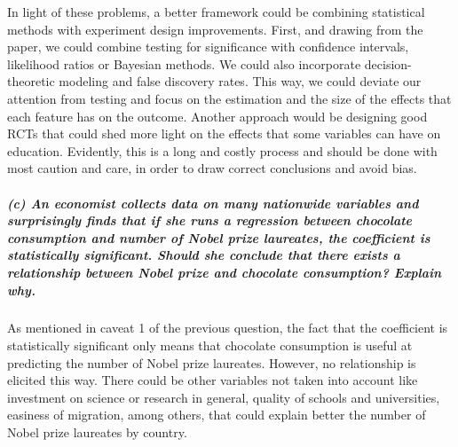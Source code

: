 \documentclass[11pt, english]{article}
\begin{document}
In light of these problems, a better framework could be combining
statistical methods with experiment design improvements. First, and
drawing from the paper, we could combine testing for significance with
confidence intervals, likelihood ratios or Bayesian methods. We could
also incorporate decision-theoretic modeling and false discovery rates.
This way, we could deviate our attention from testing and focus on the
estimation and the size of the effects that each feature has on the
outcome. Another approach would be designing good RCTs that could shed
more light on the effects that some variables can have on education.
Evidently, this is a long and costly process and should be done with
most caution and care, in order to draw correct conclusions and avoid
bias.

    \hypertarget{c-an-economist-collects-data-on-many-nationwide-variables-and-surprisingly-finds-that-if-she-runs-a-regression-between-chocolate-consumption-and-number-of-nobel-prize-laureates-the-coefficient-is-statistically-significant.-should-she-conclude-that-there-exists-a-relationship-between-nobel-prize-and-chocolate-consumption-explain-why.}{%
\subparagraph{(c) An economist collects data on many nationwide
variables and surprisingly finds that if she runs a regression between
chocolate consumption and number of Nobel prize laureates, the
coefficient is statistically significant. Should she conclude that there
exists a relationship between Nobel prize and chocolate consumption?
Explain
why.\\[2ex]}\label{c-an-economist-collects-data-on-many-nationwide-variables-and-surprisingly-finds-that-if-she-runs-a-regression-between-chocolate-consumption-and-number-of-nobel-prize-laureates-the-coefficient-is-statistically-significant.-should-she-conclude-that-there-exists-a-relationship-between-nobel-prize-and-chocolate-consumption-explain-why.}}

    As mentioned in caveat 1 of the previous question, the fact that the
coefficient is statistically significant only means that chocolate
consumption is useful at predicting the number of Nobel prize laureates.
However, no relationship is elicited this way. There could be other
variables not taken into account like investment on science or research
in general, quality of schools and universities, easiness of migration,
among others, that could explain better the number of Nobel prize
laureates by country.
\end{document}
